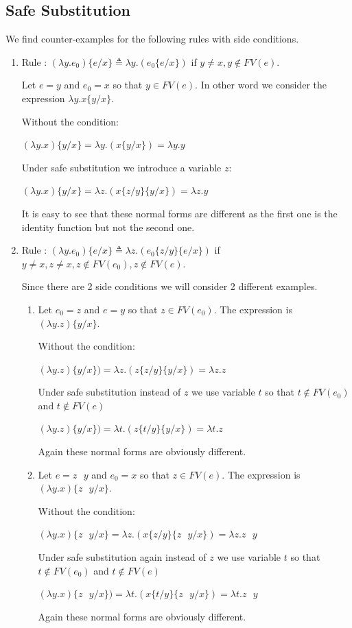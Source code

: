\documentclass[10pt]{article}
\begin{document}
\subsection*{ Safe Substitution}

We find counter-examples for the following rules with side conditions.

\begin{enumerate}
\item Rule : $(\lambda y . e_0) \{ e / x\} \triangleq \lambda y . (e_0 \{ e / x \})$ if $y \neq x, y \notin FV(e)$.

Let $e = y$ and $e_0 = x$ so that $y \in FV(e)$. In other word we consider the expression $\lambda y. x \{ y / x\}$.

Without the condition:

$(\lambda y. x )\{ y / x\} = \lambda y . (x \{ y / x \}) = \lambda y. y$

Under safe substitution we introduce a variable $z$:

$(\lambda y. x) \{ y / x\} = \lambda z . (x \{z / y\} \{y / x\}) = \lambda z . y$

It is easy to see that these normal forms are different as the first one is the identity function but not the second one.
\item Rule : $(\lambda y . e_0) \{ e / x\} \triangleq \lambda z . (e_0 \{z / y\}\{ e / x \})$ if $y \neq x, z \neq x, z \notin FV(e_0), z \notin FV(e)$.

Since there are 2 side conditions we will consider 2 different examples.
\begin{enumerate}
\item Let $e_0 = z$ and $e = y$ so that $z \in FV(e_0)$. The expression is $(\lambda y . z) \{ y / x \}$.

Without the condition:

$(\lambda y. z) \{ y / x\}) = \lambda z . (z \{z / y\} \{ y / x \}) = \lambda z. z$

Under safe substitution instead of $z$ we use variable $t$ so that $t \notin FV(e_0)$ and $t \notin FV(e)$

$(\lambda y. z) \{ y / x\}) = \lambda t . (z \{t / y\} \{y / x\}) = \lambda t . z$

Again these normal forms are obviously different.
\item Let $e = z \text{ } y$ and $e_0 = x$ so that $z \in FV(e)$. The expression is $(\lambda y . x) \{ z \text{ } y / x \}$.

Without the condition:

$(\lambda y . x) \{ z \text{ } y / x \}= \lambda z . (x \{z / y\} \{z \text{ } y / x \}) = \lambda z. z \text{ } y$

Under safe substitution again instead of $z$ we use variable $t$ so that $t \notin FV(e_0)$ and $t \notin FV(e)$

$(\lambda y.  x) \{ z \text{ } y / x\}) = \lambda t . (x \{t / y\} \{z \text{ } y / x\}) = \lambda t . z \text{ } y$

Again these normal forms are obviously different.
\end{enumerate}
\end{enumerate}
\end{document}
